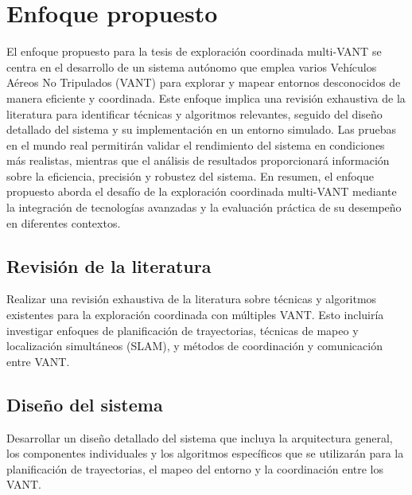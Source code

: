 \chapter{Enfoque propuesto}

El enfoque propuesto para la tesis de exploración coordinada multi-VANT se centra en el desarrollo de un sistema autónomo que emplea varios Vehículos Aéreos No Tripulados (VANT) para explorar y mapear entornos desconocidos de manera eficiente y coordinada. Este enfoque implica una revisión exhaustiva de la literatura para identificar técnicas y algoritmos relevantes, seguido del diseño detallado del sistema y su implementación en un entorno simulado. Las pruebas en el mundo real permitirán validar el rendimiento del sistema en condiciones más realistas, mientras que el análisis de resultados proporcionará información sobre la eficiencia, precisión y robustez del sistema. En resumen, el enfoque propuesto aborda el desafío de la exploración coordinada multi-VANT mediante la integración de tecnologías avanzadas y la evaluación práctica de su desempeño en diferentes contextos.


\section{Revisión de la literatura}

Realizar una revisión exhaustiva de la literatura sobre técnicas y algoritmos existentes para la exploración coordinada con múltiples VANT. Esto incluiría investigar enfoques de planificación de trayectorias, técnicas de mapeo y localización simultáneos (SLAM), y métodos de coordinación y comunicación entre VANT.

\section{Diseño del sistema}

Desarrollar un diseño detallado del sistema que incluya la arquitectura general, los componentes individuales y los algoritmos específicos que se utilizarán para la planificación de trayectorias, el mapeo del entorno y la coordinación entre los VANT.
